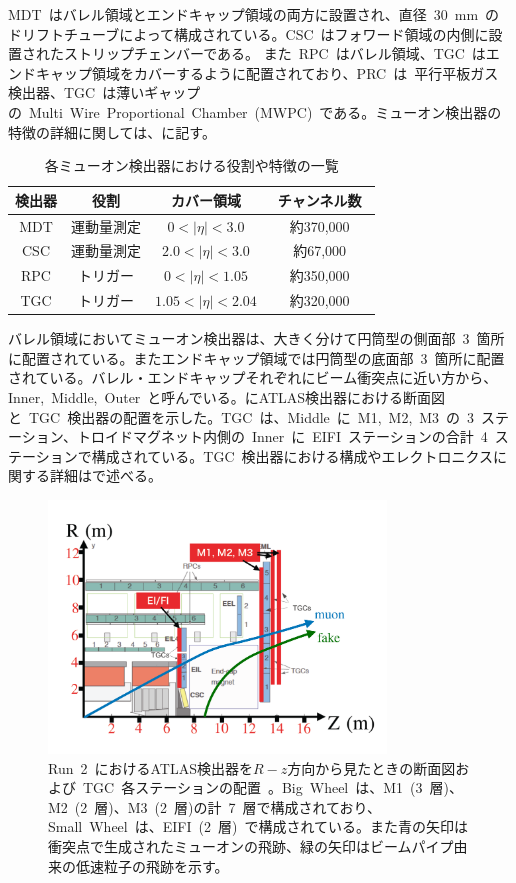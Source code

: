 MDT~はバレル領域とエンドキャップ領域の両方に設置され、直径~30~mm~のドリフトチューブによって構成されている。CSC~はフォワード領域の内側に設置されたストリップチェンバーである。 また~RPC~はバレル領域、TGC~はエンドキャップ領域をカバーするように配置されており、PRC~は~平行平板ガス検出器、TGC~は薄いギャップの~Multi~Wire~Proportional~Chamber~(MWPC)~である。ミューオン検出器の特徴の詳細に関しては、に記す。
\begin{table}[tbp]
	\centering
	\begin{tabular}{c|ccc}\hline
	    検出器 & 役割 & カバー領域 & チャンネル数　\\ \hline\hline
		MDT & 運動量測定 & $0<|\eta|<3.0$ & 約370,000 \\ 
		CSC & 運動量測定 & $2.0<|\eta|<3.0$ & 約67,000 \\
        RPC & トリガー & $0<|\eta|<1.05$ & 約350,000 \\
        TGC & トリガー & $1.05<|\eta|<2.04$ & 約320,000 \\ \hline 
	\end{tabular}
	\caption{各ミューオン検出器における役割や特徴の一覧}
    \label{tb:muon}
\end{table}

バレル領域においてミューオン検出器は、大きく分けて円筒型の側面部~3~箇所に配置されている。またエンドキャップ領域では円筒型の底面部~3~箇所に配置されている。バレル・エンドキャップそれぞれにビーム衝突点に近い方から、Inner,~Middle,~Outer~と呼んでいる。にATLAS検出器における断面図と~TGC~検出器の配置を示した。TGC~は、Middle~に~M1,~M2,~M3~の~3~ステーション、トロイドマグネット内側の~Inner~に~EIFI~ステーションの合計~4~ステーションで構成されている。TGC~検出器における構成やエレクトロニクスに関する詳細はで述べる。
\begin{figure}[tbp]
    \centering
    \includegraphics[width=0.8\textwidth,page=1]{img/pdf/fake.pdf}
    \caption[Run~2~におけるATLAS検出器を$R-z$方向から見たときの断面図および~TGC~各ステーションの配置]{Run~2~におけるATLAS検出器を$R-z$方向から見たときの断面図および~TGC~各ステーションの配置~\cite{TR:01}。Big~Wheel~は、M1~(3~層)、M2~(2~層)、M3~(2~層)の計~7~層で構成されており、Small~Wheel~は、EIFI~(2~層)~で構成されている。また青の矢印は衝突点で生成されたミューオンの飛跡、緑の矢印はビームパイプ由来の低速粒子の飛跡を示す。}\label{fig:tgc000}
\end{figure}

